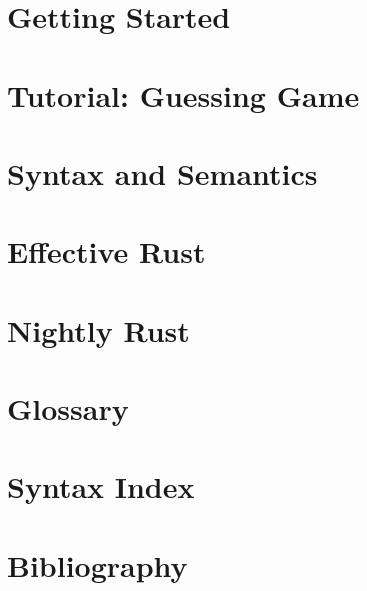 \documentclass[fontsize=12pt]{scrartcl}
\begin{document}
    \pagebreak
    \section{Getting Started}
    \label{sec:gettingstarted}
    
    
    \pagebreak
    \section{Tutorial: Guessing Game}
    \label{sec:tutorial}
    
    
    \pagebreak
    \section{Syntax and Semantics}
    \label{sec:syntax}
    
    \pagebreak
    \section{Effective Rust}
    \label{sec:effective_rust}
    
    \pagebreak
    \section{Nightly Rust}
    \label{sec:nightly_rust}
    
    \pagebreak
    \section{Glossary}
    \label{sec:glossary}
    
    
    \pagebreak
    \section{Syntax Index}
    \label{sec:syntax_index}
    
    \pagebreak
    \section{Bibliography}
    \label{sec:bib}
    
    
\end{document}
